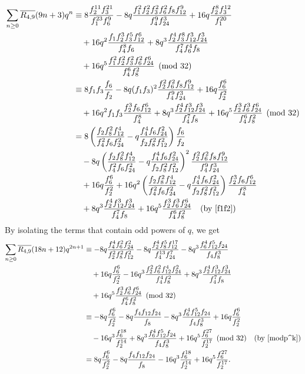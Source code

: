 \documentclass{amsart}
\theoremstyle{definition}
\begin{document}
\begin{align*}
		\sum_{n \ge 0} \overline{R_{4,9}}(9n+3) q^n 
		&\equiv 8 \frac{f_2^{11} f_3^{21}}{f_1^{23} f_{6}^9} - 8q \frac{f_1^2 f_2^2 f_3^2 f_6^2 f_8 f_{12}^9}{f_4^9 f_{24}^3} + 16q \frac{f_2^{8} f_3^{12}}{f_1^{20}} \\
		&\quad + 16q^2 \frac{f_1 f_2^3 f_3^5 f_{12}^6}{f_4^8 f_6} + 8q^3 \frac{f_2^4 f_3^8 f_{12}^3 f_{24}^3}{f_4^7 f_6^4 f_8} \\
		&\quad + 16q^5 \frac{f_1^2 f_2^2 f_3^2 f_6^2 f_{24}^6}{f_4^6 f_8^2} \pmod{32} \\
		&\equiv 8 f_1 f_3 \frac{f_6}{f_2} - 8q (f_1 f_3)^2 \frac{f_2^2 f_6^2 f_8 f_{12}^9}{f_4^9 f_{24}^3} + 16q \frac{f_6^6}{f_2^2} \\
		&\quad + 16q^2 f_1 f_3 \frac{f_2^3 f_6 f_{12}^6}{f_4^8} + 8q^3 \frac{f_2^4 f_{12}^3 f_{24}^3}{f_4^7 f_8} + 16q^5 \frac{f_2^3 f_6^3 f_{24}^6}{f_4^6 f_8^2} \pmod{32} \\
		&= 8 \left( \frac{f_2 f_8^2 f_{12}^4}{f_4^2 f_6 f_{24}^2} - q \frac{f_4^4 f_6 f_{24}^2}{f_2 f_8^2 f_{12}^2} \right) \frac{f_6}{f_2} \\
		&\quad - 8q \left( \frac{f_2 f_8^2 f_{12}^4}{f_4^2 f_6 f_{24}^2} - q \frac{f_4^4 f_6 f_{24}^2}{f_2 f_8^2 f_{12}^2} \right)^2 \frac{f_2^2 f_6^2 f_8 f_{12}^9}{f_4^9 f_{24}^3} \\
		&\quad + 16q \frac{f_6^6}{f_2^2} + 16q^2 \left( \frac{f_2 f_8^2 f_{12}^4}{f_4^2 f_6 f_{24}^2} - q \frac{f_4^4 f_6 f_{24}^2}{f_2 f_8^2 f_{12}^2} \right) \frac{f_2^3 f_6 f_{12}^6}{f_4^8} \\
		&\quad + 8q^3 \frac{f_2^4 f_{12}^3 f_{24}^3}{f_4^7 f_8} + 16q^5 \frac{f_2^3 f_6^3 f_{24}^6}{f_4^6 f_8^2} \quad \text{(by \eqref{f1f2})}
\end{align*}
By isolating the terms that contain odd powers of $q$, we get
\begin{align*}
		\sum_{n \ge 0} \overline{R_{4,9}}(18n+12) q^{2n+1} 
		&\equiv -8q \frac{f_4^4 f_6^2 f_{24}^2}{f_2^2 f_8^2 f_{12}^2} - 8q \frac{f_2^4 f_8^5 f_{12}^{17}}{f_4^{13} f_{24}^7} - 8q^3 \frac{f_6^4 f_{12}^5 f_{24}}{f_4 f_8^3} \\
		&\quad + 16q \frac{f_6^6}{f_2^2} - 16q^3 \frac{f_2^2 f_6^2 f_{12}^4 f_{24}^2}{f_4^4 f_8^2} + 8q^3 \frac{f_2^4 f_{12}^3 f_{24}^3}{f_4^7 f_8} \\
		&\quad + 16q^5 \frac{f_2^3 f_6^3 f_{24}^6}{f_4^6 f_8^2} \pmod{32} \\
		&\equiv -8q \frac{f_6^6}{f_2^2} - 8q \frac{f_4 f_{12} f_{24}}{f_8} - 8q^3 \frac{f_6^4 f_{12}^5 f_{24}}{f_4 f_8^3} + 16q \frac{f_6^6}{f_2^2} \\
		&\quad - 16q^3 \frac{f_6^{18}}{f_2^{14}} + 8q^3 \frac{f_6^4 f_{12}^5 f_{24}}{f_4 f_8^3} + 16q^5 \frac{f_6^{27}}{f_2^{17}} \pmod{32} \quad \text{(by \eqref{modp^k})} \\
		&= 8q \frac{f_6^6}{f_2^2} - 8q \frac{f_4 f_{12} f_{24}}{f_8} - 16q^3 \frac{f_6^{18}}{f_2^{14}} + 16q^5 \frac{f_6^{27}}{f_2^{17}}.
\end{align*}
\end{document}
